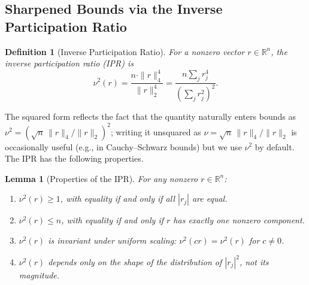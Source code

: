 \documentclass[pdflatex,sn-mathphys-num]{sn-jnl}%
\newcommand{\R}{\mathbb{R}}
\newcommand{\norm}[2]{\|#1\|_{#2}}
\theoremstyle{thmstyleone}%
\newtheorem{lemma}[theorem]{Lemma}
\theoremstyle{thmstyletwo}%
\theoremstyle{thmstylethree}%
\newtheorem{definition}{Definition}%
\begin{document}
\subsection{Sharpened Bounds via the Inverse Participation Ratio}
\label{sec:sharp}

\begin{definition}[Inverse Participation Ratio]
\label{def:ipr}
For a nonzero vector $r \in \R^n$, the \emph{inverse participation ratio} (IPR) is
\begin{equation}
\label{eq:ipr}
\nu^2(r) = \frac{n \cdot \norm{r}{4}^4}{\norm{r}{2}^4} = \frac{n \sum_j r_j^4}{\left(\sum_j r_j^2\right)^2}.
\end{equation}
\end{definition}

The squared form reflects the fact that the quantity naturally enters bounds
as $\nu^2 = (\sqrt{n}\,\|r\|_4/\|r\|_2)^2$; writing it unsquared as
$\nu = \sqrt{n}\,\|r\|_4/\|r\|_2$ is occasionally useful (e.g., in
Cauchy--Schwarz bounds) but we use $\nu^2$ by default. The IPR has the
following properties.

\begin{lemma}[Properties of the IPR]
\label{lem:ipr-properties}
For any nonzero $r \in \R^n$:
\begin{enumerate}[label=(\roman*)]
    \item $\nu^2(r) \geq 1$, with equality if and only if all $|r_j|$ are equal.
    \item $\nu^2(r) \leq n$, with equality if and only if $r$ has exactly one nonzero component.
    \item $\nu^2(r)$ is invariant under uniform scaling: $\nu^2(cr) = \nu^2(r)$ for $c \neq 0$.
    \item $\nu^2(r)$ depends only on the \emph{shape} of the distribution of $|r_j|^2$, not its magnitude.
\end{enumerate}
\end{lemma}
\end{document}
